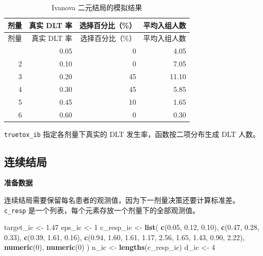 \documentclass[
  chinese,
]{article}
\newenvironment{Shaded}{\begin{snugshade}}{\end{snugshade}}
\newcommand{\DecValTok}[1]{\textcolor[rgb]{0.00,0.00,0.81}{#1}}
\newcommand{\FloatTok}[1]{\textcolor[rgb]{0.00,0.00,0.81}{#1}}
\newcommand{\FunctionTok}[1]{\textcolor[rgb]{0.13,0.29,0.53}{\textbf{#1}}}
\newcommand{\NormalTok}[1]{#1}
\newcommand{\OtherTok}[1]{\textcolor[rgb]{0.56,0.35,0.01}{#1}}
\begin{document}
\begin{longtable}[]{@{}rrrr@{}}
\caption{Ivanova 二元结局的模拟结果}\tabularnewline
\toprule\noalign{}
剂量 & 真实 DLT 率 & 选择百分比（\%） & 平均入组人数 \\
\midrule\noalign{}
\endfirsthead
\toprule\noalign{}
剂量 & 真实 DLT 率 & 选择百分比（\%） & 平均入组人数 \\
\midrule\noalign{}
\endhead
\bottomrule\noalign{}
\endlastfoot
1 & 0.05 & 0 & 4.05 \\
2 & 0.10 & 0 & 7.05 \\
3 & 0.20 & 45 & 11.10 \\
4 & 0.30 & 45 & 5.85 \\
5 & 0.45 & 10 & 1.65 \\
6 & 0.60 & 0 & 0.30 \\
\end{longtable}

\texttt{truetox\_ib} 指定各剂量下真实的 DLT 发生率，函数按二项分布生成
DLT 人数。

\subsection{连续结局}\label{ux8fdeux7eedux7ed3ux5c40}

\textbf{准备数据}

连续结局需要保留每名患者的观测值，因为下一剂量决策还要计算标准差。
\texttt{c\_resp} 是一个列表，每个元素存放一个剂量下的全部观测值。

\begin{Shaded}
\begin{Highlighting}[]
\NormalTok{target\_ic }\OtherTok{\textless{}{-}} \FloatTok{1.47}
\NormalTok{eps\_ic }\OtherTok{\textless{}{-}} \DecValTok{1}
\NormalTok{c\_resp\_ic }\OtherTok{\textless{}{-}} \FunctionTok{list}\NormalTok{(}
  \FunctionTok{c}\NormalTok{(}\FloatTok{0.05}\NormalTok{, }\FloatTok{0.12}\NormalTok{, }\FloatTok{0.10}\NormalTok{),}
  \FunctionTok{c}\NormalTok{(}\FloatTok{0.47}\NormalTok{, }\FloatTok{0.28}\NormalTok{, }\FloatTok{0.33}\NormalTok{),}
  \FunctionTok{c}\NormalTok{(}\FloatTok{0.39}\NormalTok{, }\FloatTok{1.61}\NormalTok{, }\FloatTok{0.16}\NormalTok{),}
  \FunctionTok{c}\NormalTok{(}\FloatTok{0.94}\NormalTok{, }\FloatTok{1.60}\NormalTok{, }\FloatTok{1.61}\NormalTok{, }\FloatTok{1.17}\NormalTok{, }\FloatTok{2.56}\NormalTok{, }\FloatTok{1.65}\NormalTok{, }\FloatTok{1.43}\NormalTok{, }\FloatTok{0.90}\NormalTok{, }\FloatTok{2.22}\NormalTok{),}
  \FunctionTok{numeric}\NormalTok{(}\DecValTok{0}\NormalTok{),}
  \FunctionTok{numeric}\NormalTok{(}\DecValTok{0}\NormalTok{)}
\NormalTok{)}
\NormalTok{n\_ic }\OtherTok{\textless{}{-}} \FunctionTok{lengths}\NormalTok{(c\_resp\_ic)}
\NormalTok{d\_ic }\OtherTok{\textless{}{-}} \DecValTok{4}
\end{Highlighting}
\end{Shaded}
\end{document}
